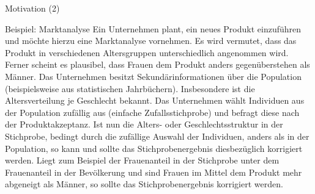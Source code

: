\documentclass[9pt]{beamer}
\begin{document}
\begin{frame}{Motivation (2)}
\begin{block}{Beispiel: Marktanalyse}
Ein Unternehmen plant, ein neues Produkt einzuführen und möchte hierzu eine Marktanalyse vornehmen. Es wird vermutet, dass das Produkt in verschiedenen Altersgruppen unterschiedlich angenommen wird. Ferner scheint es plausibel, dass Frauen dem Produkt anders gegenüberstehen als Männer. Das Unternehmen besitzt Sekundärinformationen über die Population (beispielsweise aus statistischen Jahrbüchern). Insbesondere ist die Altersverteilung je Geschlecht bekannt. Das Unternehmen wählt Individuen aus der Population zufällig aus (einfache Zufallsstichprobe) und befragt diese nach der Produktakzeptanz. Ist nun die Alters- oder Geschlechtsstruktur in der Stichprobe, bedingt durch die zufällige Auswahl der Individuen, anders als in der Population, so kann und sollte das Stichprobenergebnis diesbezüglich korrigiert werden. Liegt zum Beispiel der Frauenanteil in der Stichprobe unter dem Frauenanteil in der Bevölkerung und sind Frauen im Mittel dem Produkt mehr abgeneigt als Männer, so sollte das Stichprobenergebnis korrigiert werden.
\end{block}
\end{frame}
\end{document}
